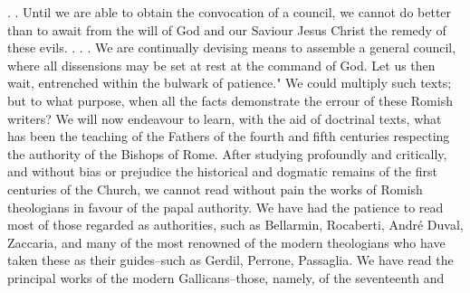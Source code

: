 . . Until we are able to obtain the convocation of a council, we cannot do better than to await from the will of God and our Saviour Jesus Christ the remedy of these evils. . . . We are continually devising means to assemble a general council, where all dissensions may be set at rest at the command of God. Let us then wait, entrenched within the bulwark of patience." We could multiply such texts; but to what purpose, when all the facts demonstrate the errour of these Romish writers? We will now endeavour to learn, with the aid of doctrinal texts, what has been the teaching of the Fathers of the fourth and fifth centuries respecting the authority of the Bishops of Rome. After studying profoundly and critically, and without bias or prejudice the historical and dogmatic remains of the first centuries of the Church, we cannot read without pain the works of Romish theologians in favour of the papal authority. We have had the patience to read most of those regarded as authorities, such as Bellarmin, Rocaberti, André Duval, Zaccaria, and many of the most renowned of the modern theologians who have taken these as their guides--such as Gerdil, Perrone, Passaglia. We have read the principal works of the modern Gallicans--those, namely, of the seventeenth and

